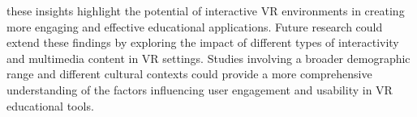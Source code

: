 \documentclass[conference]{IEEEtran}
\begin{document}
these insights highlight the potential of interactive VR environments in creating more engaging and effective educational applications. Future research could extend these findings by exploring the impact of different types of interactivity and multimedia content in VR settings. Studies involving a broader demographic range and different cultural contexts could provide a more comprehensive understanding of the factors influencing user engagement and usability in VR educational tools.



\end{document}
